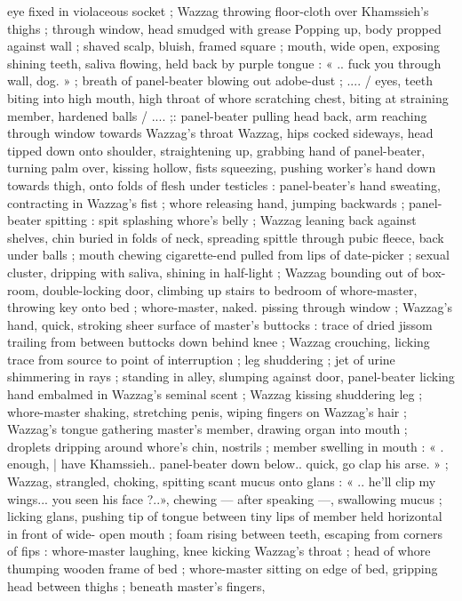 eye fixed in violaceous socket ; Wazzag throwing floor-cloth over
Khamssieh's thighs ; through window, head smudged with grease
Popping up, body propped against wall ; shaved scalp, bluish, framed
square ; mouth, wide open, exposing shining teeth, saliva flowing,
held back by purple tongue : « .. fuck you through wall, dog. » ;
breath of panel-beater blowing out adobe-dust ; .... / eyes, teeth
biting into high mouth, high throat of whore scratching chest, biting
at straining member, hardened balls / .... ;: panel-beater pulling head
back, arm reaching through window towards Wazzag's throat
Wazzag, hips cocked sideways, head tipped down onto shoulder,
straightening up, grabbing hand of panel-beater, turning palm over,
kissing hollow, fists squeezing, pushing worker's hand down towards
thigh, onto folds of flesh under testicles : panel-beater's hand
sweating, contracting in Wazzag's fist ; whore releasing hand,
jumping backwards ; panel-beater spitting : spit splashing whore's
belly ; Wazzag leaning back against shelves, chin buried in folds of
neck, spreading spittle through pubic fleece, back under balls ;
mouth chewing cigarette-end pulled from lips of date-picker ; sexual
cluster, dripping with saliva, shining in half-light ; Wazzag bounding
out of box-room, double-locking door, climbing up stairs to bedroom
of whore-master, throwing key onto bed ; whore-master, naked.
pissing through window ; Wazzag's hand, quick, stroking sheer
surface of master's buttocks : trace of dried jissom trailing from
between buttocks down behind knee ; Wazzag crouching, licking
trace from source to point of interruption ; leg shuddering ; jet of
urine shimmering in rays ; standing in alley, slumping against door,
panel-beater licking hand embalmed in Wazzag's seminal scent ;
Wazzag kissing shuddering leg ; whore-master shaking, stretching
penis, wiping fingers on Wazzag's hair ; Wazzag's tongue gathering
master's member, drawing organ into mouth ; droplets dripping
around whore's chin, nostrils ; member swelling in mouth : « .
enough, | have Khamssieh.. panel-beater down below.. quick, go clap
his arse. » ; Wazzag, strangled, choking, spitting scant mucus onto
glans : « .. he'll clip my wings... you seen his face ?..», chewing ---
after speaking ---, swallowing mucus ; licking glans, pushing tip of
tongue between tiny lips of member held horizontal in front of wide-
open mouth ; foam rising between teeth, escaping from corners of
fips : whore-master laughing, knee kicking Wazzag's throat ; head of
whore thumping wooden frame of bed ; whore-master sitting on edge
of bed, gripping head between thighs ; beneath master's fingers,
